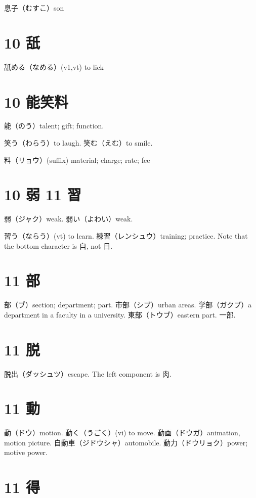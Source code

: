 息子（むすこ）son

\section{10 舐}

舐める（なめる）(v1,vt) to lick

\section{10 能笑料}

能（のう）talent; gift; function.

笑う（わらう）to laugh.
笑む（えむ）to smile.

料（リョウ）(suffix) material; charge; rate; fee

\section{10 弱 11 習}

弱（ジャク）weak.
弱い（よわい）weak.

習う（ならう）(vt) to learn.
練習（レンシュウ）training; practice.
Note that the bottom character is 自, not 日.

\section{11 部}

部（ブ）section; department; part.
市部（シブ）urban areas.
学部（ガクブ）a department in a faculty in a university.
東部（トウブ）eastern part.
一部.

\section{11 脱}

脱出（ダッシュツ）escape.
The left component is 肉.

\section{11 動}

動（ドウ）motion.
動く（うごく）(vi) to move.
動画（ドウガ）animation, motion picture.
自動車（ジドウシャ）automobile.
動力（ドウリョク）power; motive power.

\section{11 得}

